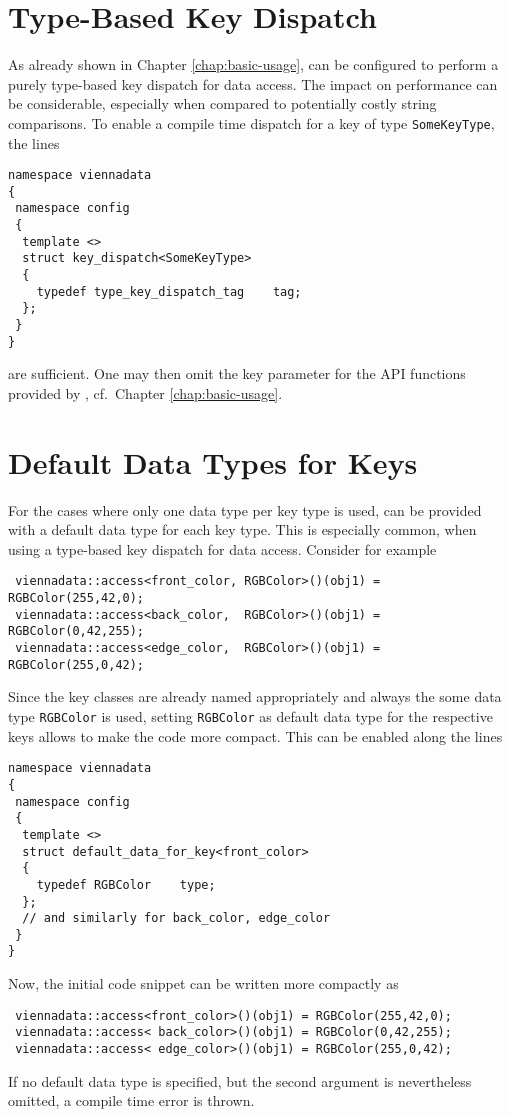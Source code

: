 \section{Type-Based Key Dispatch} \label{sec:compiletime-keys}
As already shown in Chapter \ref{chap:basic-usage}, {\ViennaData} can be configured to perform a purely type-based key dispatch for data access.
The impact on performance can be considerable, especially when compared to potentially costly string comparisons.
To enable a compile time dispatch for a key of type \lstinline|SomeKeyType|, the lines
\begin{lstlisting}
namespace viennadata
{
 namespace config
 {
  template <>
  struct key_dispatch<SomeKeyType>
  {
    typedef type_key_dispatch_tag    tag;
  };
 }
} 
\end{lstlisting}
are sufficient. One may then omit the key parameter for the API functions provided by {\ViennaData}, cf.~Chapter \ref{chap:basic-usage}.


\section{Default Data Types for Keys} \label{sec:default-valuetype}
For the cases where only one data type per key type is used, {\ViennaData} can be provided with a default data type for each key type.
This is especially common, when using a type-based key dispatch for data access. Consider for example
\begin{lstlisting}
 viennadata::access<front_color, RGBColor>()(obj1) = RGBColor(255,42,0);
 viennadata::access<back_color,  RGBColor>()(obj1) = RGBColor(0,42,255);
 viennadata::access<edge_color,  RGBColor>()(obj1) = RGBColor(255,0,42);
\end{lstlisting}
Since the key classes are already named appropriately and always the some data type \lstinline|RGBColor| is used, 
setting \lstinline|RGBColor| as default data type for the respective keys allows to make the code more compact.
This can be enabled along the lines
\begin{lstlisting}
namespace viennadata
{
 namespace config
 {
  template <>
  struct default_data_for_key<front_color>
  {
    typedef RGBColor    type;
  };
  // and similarly for back_color, edge_color
 }
} 
\end{lstlisting}
Now, the initial code snippet can be written more compactly as
\begin{lstlisting}
 viennadata::access<front_color>()(obj1) = RGBColor(255,42,0);
 viennadata::access< back_color>()(obj1) = RGBColor(0,42,255);
 viennadata::access< edge_color>()(obj1) = RGBColor(255,0,42);
\end{lstlisting}
If no default data type is specified, but the second argument is nevertheless omitted, a compile time error is thrown.